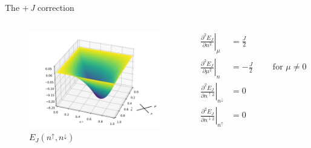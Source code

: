 \documentclass[xcolor=table,aspectratio=169]{beamer}
\numberwithin{equation}{section}
\begin{document}
\begin{frame}{The +\,\emph{J} correction}
    \begin{columns}
        \begin{figure}[h!]
            \includegraphics[width=\columnwidth]{figures/j_correction.pdf}
            \caption{$E_{J}(n^\uparrow,n^\downarrow)$}
            \label{fig:j_correction}
        \end{figure}
        \footnotesize
        \begin{subequations}
            \begin{align}
                \left.\frac{\partial^2E_{J}}{\partial n^2}\right|_{\mu}                     & = \frac{J}{2}                                 \\
                \left.\frac{\partial^2E_{J}}{\partial\mu^2}\right|_{n}                      & = -\frac{J}{2} \qquad \text{ for } \mu \neq 0 \\
                \left.\frac{\partial^2E_{J}}{\partial n^{\uparrow 2}}\right|_{n^\downarrow} & = 0                                           \\
                \left.\frac{\partial^2E_{J}}{\partial n^{\downarrow 2}}\right|_{n^\uparrow} & = 0
            \end{align}
        \end{subequations}
    \end{columns}
\end{frame}
\end{document}
